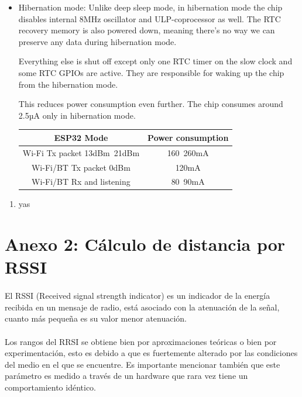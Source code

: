 \documentclass[a4paper ,12pt, onecolumn]{article}
\begin{document}
\begin{itemize}
    \item Hibernation mode: Unlike deep sleep mode, in hibernation mode the chip disables internal 8MHz oscillator and ULP-coprocessor as well. The RTC recovery memory is also powered down, meaning there’s no way we can preserve any data during hibernation mode.

    Everything else is shut off except only one RTC timer on the slow clock and some RTC GPIOs are active. They are responsible for waking up the chip from the hibernation mode.
    
    This reduces power consumption even further. The chip consumes around 2.5µA only in hibernation mode.

    \begin{center}
        \begin{tabular}{||c | c ||} 
        \hline
        ESP32 Mode & Power consumption  \\ [0.5ex] 
        \hline\hline
        Wi-Fi Tx packet 13dBm~21dBm & 160~260mA  \\ 
        \hline
        Wi-Fi/BT Tx packet 0dBm	 & 120mA  \\
        \hline
        Wi-Fi/BT Rx and listening & 80~90mA  \\
        \hline
       \end{tabular}
       \end{center}
\end{itemize}
\begin{enumerate}
    \item  yas
\end{enumerate}

\section{Anexo 2: Cálculo de distancia por RSSI}
\paragraph{}
El RSSI (Received signal strength indicator) es un indicador de la energía recibida en un mensaje de radio, 
está asociado con la atenuación de la señal, cuanto más pequeña es su valor menor atenuación.
\paragraph{}
Los rangos del RRSI se obtiene bien por aproximaciones teóricas o bien por experimentación, esto es debido a que 
es fuertemente alterado por las condiciones del medio en el que se encuentre. Es importante mencionar también que
este parámetro es medido a través de un hardware que rara vez tiene un comportamiento idéntico.
\end{document}
